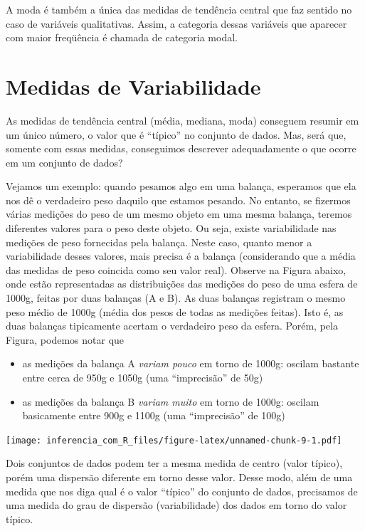 \documentclass[
]{book}
\providecommand{\tightlist}{%
  \setlength{\itemsep}{0pt}\setlength{\parskip}{0pt}}
\begin{document}
A moda é também a única das medidas de tendência central que faz sentido no caso de variáveis qualitativas. Assim, a categoria dessas variáveis que aparecer com maior freqüência é chamada de categoria modal.

\hypertarget{medidas-de-variabilidade}{%
\section{Medidas de Variabilidade}\label{medidas-de-variabilidade}}

As medidas de tendência central (média, mediana, moda) conseguem resumir em um único número, o valor que é ``típico'' no conjunto de dados. Mas, será que, somente com essas medidas, conseguimos descrever adequadamente o que ocorre em um conjunto de dados?

Vejamos um exemplo: quando pesamos algo em uma balança, esperamos que ela nos dê o verdadeiro peso daquilo que estamos pesando. No entanto, se fizermos várias medições do peso de um mesmo objeto em uma mesma balança, teremos diferentes valores para o peso deste objeto. Ou seja, existe variabilidade nas medições de peso fornecidas pela balança. Neste caso, quanto menor a variabilidade desses valores, mais precisa é a balança (considerando que a média das medidas de peso coincida como seu valor real). Observe na Figura abaixo, onde estão representadas as distribuições das medições do peso de uma esfera de 1000g, feitas por duas balanças (A e B). As duas balanças registram o mesmo peso médio de 1000g (média dos pesos de todas as medições feitas). Isto é, as duas balanças tipicamente acertam o verdadeiro peso da esfera. Porém, pela Figura, podemos notar que

\begin{itemize}
\tightlist
\item
  as medições da balança A \emph{variam pouco} em torno de 1000g: oscilam bastante entre cerca de 950g e 1050g (uma ``imprecisão'' de 50g)
\item
  as medições da balança B \emph{variam muito} em torno de 1000g: oscilam basicamente entre 900g e 1100g (uma ``imprecisão'' de 100g)
\end{itemize}

\texttt{[image: inferencia\_com\_R\_files/figure-latex/unnamed-chunk-9-1.pdf]}

Dois conjuntos de dados podem ter a mesma medida de centro (valor típico), porém uma dispersão diferente em torno desse valor. Desse modo, além de uma medida que nos diga qual é o valor ``típico'' do conjunto de dados, precisamos de uma medida do grau de dispersão (variabilidade) dos dados em torno do valor típico.
\end{document}
